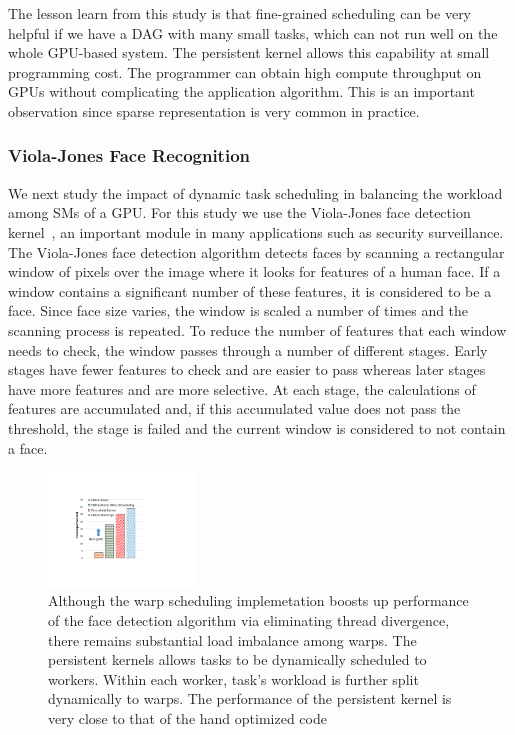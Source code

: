 The lesson learn from this study is that fine-grained scheduling can be very helpful if we have a DAG with many small tasks, which can not run well on the whole GPU-based system.
The persistent kernel allows this capability at small programming cost.
The programmer can obtain high compute throughput on GPUs without complicating the application algorithm.
This is an important observation since sparse representation is very common in practice.

\subsubsection{Viola-Jones Face Recognition}
We next study the impact of dynamic task scheduling in balancing the workload among SMs of a GPU.
For this study we use the Viola-Jones face detection kernel~\cite{facedetection1, facedetection2}, an important module in many applications such as security surveillance.
The Viola-Jones face detection algorithm detects faces by scanning a rectangular window of pixels over the image where it looks for features of a human face. 
If a window contains a significant number of these features, it is considered to be a face. 
Since face size varies, the window is scaled a number of times and the scanning process is repeated. 
To reduce the number of features that each window needs to check, the window passes through a number of different stages. 
Early stages have fewer features to check and are easier to pass whereas later stages have more features and are more selective. 
At each stage, the calculations of features are accumulated and, if this accumulated value does not pass the threshold, the stage is failed and the current window is considered to not contain a face. 


\begin{figure}[htb]
\centering
\includegraphics[width=0.35\textwidth]{figures/faceRecognition.pdf}
\caption{Although the warp scheduling implemetation boosts up performance of the face detection algorithm via eliminating thread divergence, there remains substantial load imbalance among warps. The persistent kernels allows tasks to be dynamically scheduled to workers. Within each worker, task's workload is further split dynamically to warps. The performance of the persistent kernel is very close to that of the hand optimized code}
\label{faceRecognition}
\end{figure}




